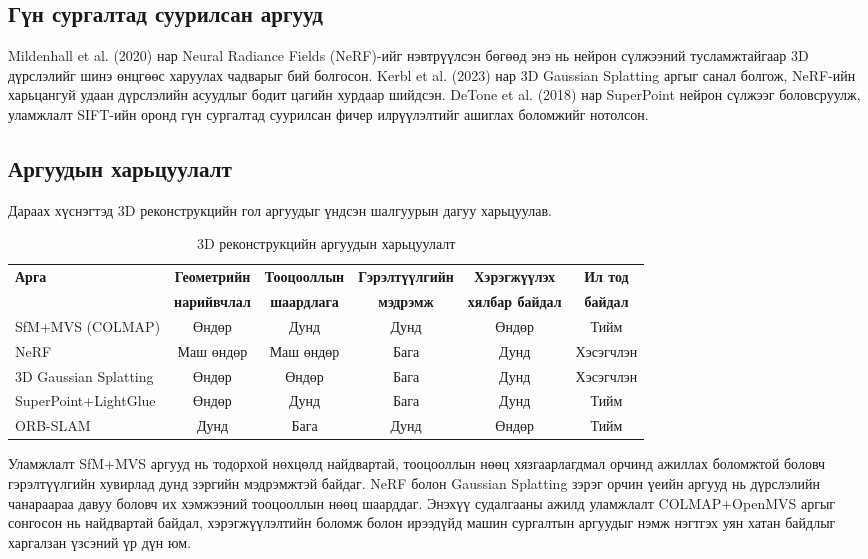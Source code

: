 \subsection{Гүн сургалтад суурилсан аргууд}

Mildenhall et al. (2020) нар Neural Radiance Fields (NeRF)-ийг нэвтрүүлсэн бөгөөд энэ нь
нейрон сүлжээний тусламжтайгаар 3D дүрслэлийг шинэ өнцгөөс харуулах чадварыг
бий болгосон. Kerbl et al. (2023) нар 3D Gaussian Splatting аргыг санал болгож, NeRF-ийн
харьцангуй удаан дүрслэлийн асуудлыг бодит цагийн хурдаар шийдсэн. DeTone et al.
(2018) нар SuperPoint нейрон сүлжээг боловсруулж, уламжлалт SIFT-ийн оронд гүн
сургалтад суурилсан фичер илрүүлэлтийг ашиглах боломжийг нотолсон.

\subsection{Аргуудын харьцуулалт}

Дараах хүснэгтэд 3D реконструкцийн гол аргуудыг үндсэн шалгуурын дагуу харьцуулав.

\begin{table}[H]
\centering
\caption{3D реконструкцийн аргуудын харьцуулалт}
\label{tab:method_comparison}
\small
\begin{tabular}{|l|c|c|c|c|c|}
\hline
\textbf{Арга} & \textbf{Геометрийн} & \textbf{Тооцооллын} & \textbf{Гэрэлтүүлгийн} & \textbf{Хэрэгжүүлэх} & \textbf{Ил тод} \\
              & \textbf{нарийвчлал} & \textbf{шаардлага}  & \textbf{мэдрэмж}        & \textbf{хялбар байдал} & \textbf{байдал} \\ \hline
SfM+MVS (COLMAP) & Өндөр & Дунд & Дунд & Өндөр & Тийм \\ \hline
NeRF             & Маш өндөр & Маш өндөр & Бага & Дунд & Хэсэгчлэн \\ \hline
3D Gaussian Splatting & Өндөр & Өндөр & Бага & Дунд & Хэсэгчлэн \\ \hline
SuperPoint+LightGlue  & Өндөр & Дунд & Бага & Дунд & Тийм \\ \hline
ORB-SLAM             & Дунд & Бага & Дунд & Өндөр & Тийм \\ \hline
\end{tabular}
\end{table}

Уламжлалт SfM+MVS аргууд нь тодорхой нөхцөлд найдвартай, тооцооллын нөөц хязгаарлагдмал орчинд ажиллах боломжтой боловч гэрэлтүүлгийн хувирлад дунд зэргийн мэдрэмжтэй байдаг. NeRF болон Gaussian Splatting зэрэг орчин үеийн аргууд нь дүрслэлийн чанараараа давуу боловч их хэмжээний тооцооллын нөөц шаарддаг. Энэхүү судалгааны ажилд уламжлалт COLMAP+OpenMVS аргыг сонгосон нь найдвартай байдал, хэрэгжүүлэлтийн боломж болон ирээдүйд машин сургалтын аргуудыг нэмж нэгтгэх уян хатан байдлыг харгалзан үзсэний үр дүн юм.

